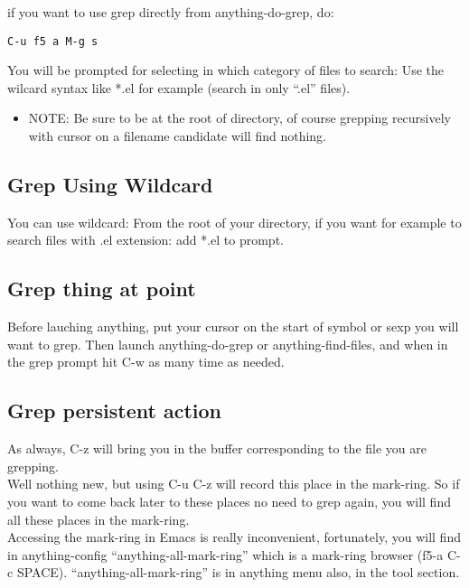 \documentclass[a4paper,11pt]{article}
\begin{document}
if you want to use grep directly from anything-do-grep, do:

\begin{verbatim}
C-u f5 a M-g s
\end{verbatim}

You will be prompted for selecting in which category of files to search:
Use the wilcard syntax like *.el for example (search in only ``.el'' files).
\\
\begin{itemize}
\item NOTE: Be sure to be at the root of directory, of course grepping recursively with cursor
on a filename candidate will find nothing.

\end{itemize}
\subsection{Grep Using Wildcard}
\label{sec:grep-using-wildcard}
You can use wildcard:
From the root of your directory, if you want for example to search files with .el extension:
add *.el to prompt.

\subsection{Grep thing at point}
\label{sec:grep-thing-at}
Before lauching anything, put your cursor on the start of symbol or sexp you will want to grep.
Then launch anything-do-grep or anything-find-files, and when in the grep prompt hit C-w as many time as needed.

\subsection{Grep persistent action}
\label{sec:grep-pers-acti}
As always, C-z will bring you in the buffer corresponding to the file you are grepping. \\
Well nothing new, but using C-u C-z will record this place in the mark-ring.
So if you want to come back later to these places no need to grep again, you will find all these 
places in the mark-ring.\\
Accessing the mark-ring in Emacs is really inconvenient, fortunately, you will find in anything-config 
``anything-all-mark-ring'' which is a mark-ring browser (f5-a C-c SPACE).
\newpage
``anything-all-mark-ring'' is in anything menu also, in the tool section.\\
\end{document}
